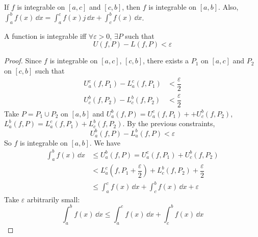 \documentclass{report}
\begin{document}
\begin{theorem}{33.6}
    If $f$ is integrable on $[a, c]$ and $[c, b]$, then $f$ is integrable on $[a, b]$. Also, $\int_{a}^{b} f(x) \, \dd{x}  = \int_{a}^{c} f(x)j \, \dd{x}  + \int_{c}^{b} f(x) \, \dd{x} $.
\end{theorem}

\begin{theorem}{32.5}
    A function is integrable iff $\forall \varepsilon>  0$, $\exists P$ such that 
        \begin{equation*}
            U(f, P) - L(f, P) < \varepsilon
        \end{equation*}
\end{theorem}
    \begin{proof}
        Since $f$ is integrable on $[a, c]$, $[c, b]$, there exists a $P_{1}$ on $[a, c]$ and $P_{2}$ on $[c, b]$ such that 
            \begin{align*}
                U_{a}^{c}(f, P_{1}) - L_{a}^{c}(f, P_{1}) &< \dfrac{\varepsilon}{ 2} \\
                U_{c}^{b}(f, P_{2}) - L_{c}^{b}(f, P_{2}) &< \dfrac{\varepsilon}{ 2}   
            \end{align*}
        Take $P = P_{1} \cup P_{ 2}$ on $[a, b]$ and $U_{a}^{b}(f, P) = U_{a}^{c}(f, P_{1}) ++ U_{c}^{b}(f, P_{2})$, $L_{a}^{b}(f, P) = L_{a}^{c}(f, P_{1}) + L_{c}^{b}(f, P_{2})$. By the previous constraints,
            \begin{equation*}
                U_{a}^{b}(f, P) - L_{a}^{b}(f, P) < \varepsilon
            \end{equation*}
        So $f$ is integrable on $[a, b]$. We have 
            \begin{align*}
                \int_{a}^{b} f(x) \, \dd{x} &\leq U_{ a}^{b}(f, P) = U_{a}^{c}(f, P_{1}) + U_{c}^{b}(f, P_{2}) \\
                                            &< L_{ a}^{c}(f, P_{1} + \dfrac{\varepsilon}{ 2}) + L_{c}^{b}(f, P_{2}) + \dfrac{\varepsilon}{ 2} \\
                                            &\leq \int_{ a}^{c} f(x)  \, \dd{x} + \int_{c}^{b} f(x) \, \dd{x} + \varepsilon 
            \end{align*}
        Take $\varepsilon$ arbitrarily small:
            \begin{equation*}
                \int_{a}^{b} f(x) \, \dd{x} \leq \int_{ a}^{c} f(x) \, \dd{x}  + \int_{c}^{b} f(x) \, \dd{x} 
            \end{equation*}

\end{proof}
\end{document}
